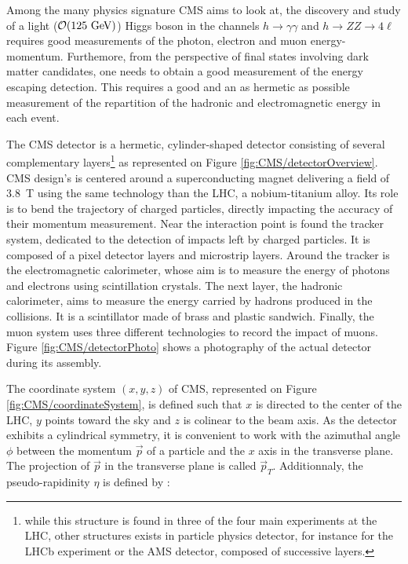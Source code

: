         Among the many physics signature CMS aims to look at, the discovery and study of a
        light ($\mathcal{O}(125 ~\text{GeV})$) Higgs boson in the channels $h\rightarrow\gamma\gamma$
        and $h\rightarrow ZZ \rightarrow 4\ell$ requires good measurements of the photon,
        electron and muon energy-momentum. Furthemore, from the perspective of final
        states involving dark matter candidates, one needs to obtain a good measurement
        of the energy escaping detection. This requires a good and an as hermetic as
        possible measurement of the repartition of the hadronic and electromagnetic energy
        in each event.


        The CMS detector is a hermetic, cylinder-shaped detector consisting of several
        complementary layers\footnote{while this structure is found in three of the four
        main experiments at the LHC, other structures exists in particle physics detector,
        for instance for the LHCb experiment or the AMS detector, composed of successive
        layers.} as represented on Figure \ref{fig:CMS/detectorOverview}.
        CMS design's is centered around a superconducting magnet delivering a field of 3.8~T
        using the same technology than the LHC, a nobium-titanium alloy. Its role is to
        bend the trajectory of charged particles, directly impacting the accuracy of
        their momentum measurement. Near the interaction point is found the tracker system, dedicated to
        the detection of impacts left by charged particles. It is composed of a pixel detector
        layers and microstrip layers. Around the tracker is the electromagnetic
        calorimeter, whose aim is to measure the energy of photons and electrons using
        scintillation crystals. The next layer, the hadronic calorimeter, aims to measure
        the energy carried by hadrons produced in the collisions. It is a scintillator made
        of brass and plastic sandwich. Finally, the muon system uses three different
        technologies to record the impact of muons. Figure \ref{fig:CMS/detectorPhoto}
        shows a photography of the actual detector during its assembly.


        The coordinate system $(x,y,z)$ of CMS, represented on Figure \ref{fig:CMS/coordinateSystem},
        is defined such that $x$ is directed to the center of the LHC, $y$ points toward
        the sky and $z$ is colinear to the beam axis. As the detector exhibits a
        cylindrical symmetry, it is convenient to work with the azimuthal angle $\phi$
        between the momentum $\vec{p}$ of a particle and the $x$ axis in the transverse
        plane. The projection of $\vec{p}$ in the transverse plane is called $\vec{p}_T$.
        Additionnaly, the pseudo-rapidinity $\eta$ is defined by :

